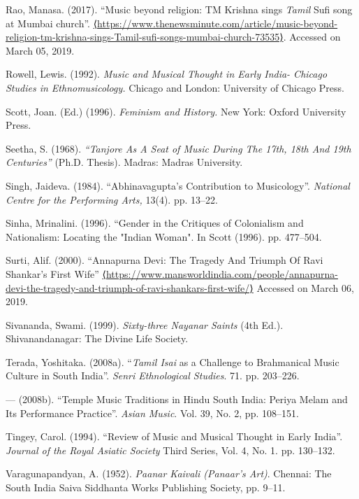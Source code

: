 {\begin{thebibliography}{99}
  Rao, Manasa. (2017). “Music beyond religion: TM Krishna sings \textit{Tamil} Sufi song at Mumbai church”. \url{⟨https://www.thenewsminute.com/article/music-beyond-religion-tm-krishna-sings-Tamil-sufi-songs-mumbai-church-73535⟩}. Accessed on March 05, 2019.

  Rowell, Lewis. (1992). \textit{Music and Musical Thought in Early India- Chicago Studies in Ethnomusicology.} Chicago and London: University of Chicago Press.

  Scott, Joan. (Ed.) (1996).\textit{ Feminism and History. }New York: Oxford University Press.

  Seetha, S. (1968). \textit{“Tanjore As A Seat of Music During The 17th, 18th And 19th Centuries” }(Ph.D. Thesis). Madras: Madras University.

  Singh, Jaideva. (1984). “Abhinavagupta's Contribution to Musicology”. \textit{National Centre for the Performing Arts, }13(4). pp. 13--22.

  Sinha, Mrinalini. (1996). “Gender in the Critiques of Colonialism and Nationalism: Locating the "Indian Woman". In Scott (1996). pp. 477--504.

  Surti, Alif. (2000). “Annapurna Devi: The Tragedy And Triumph Of Ravi Shankar’s First Wife” \url{⟨https://www.mansworldindia.com/people/annapurna-devi-the-tragedy-and-triumph-of-ravi-shankars-first-wife/⟩} Accessed on March 06, 2019.

  Sivananda, Swami. (1999). \textit{Sixty-three Nayanar Saints} (4th Ed.). Shivanandanagar: The Divine Life Society.

  Terada, Yoshitaka. (2008a). “\textit{Tamil Isai} as a Challenge to Brahmanical Music Culture in South India”. \textit{Senri Ethnological Studies}. 71. pp. 203--226.

  — (2008b). “Temple Music Traditions in Hindu South India: Periya Melam and Its Performance Practice”. \textit{Asian Music}. Vol. 39, No. 2, pp. 108--151.

  Tingey, Carol. (1994). “Review of Music and Musical Thought in Early India”. \textit{Journal of the Royal Asiatic Society} Third Series, Vol. 4, No. 1. pp. 130--132.

  Varagunapandyan, A. (1952). \textit{Paanar Kaivali (Panaar's Art)}. Chennai: The South India Saiva Siddhanta Works Publishing Society, pp. 9--11.


\end{thebibliography}}
